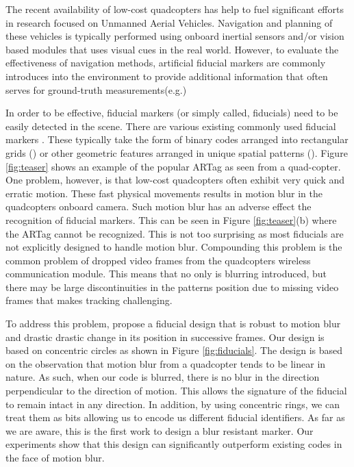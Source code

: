 \documentclass[runningheads]{llncs}
\begin{document}
The recent availability of low-cost quadcopters has help to fuel significant efforts in
research focused on Unmanned Aerial Vehicles.  Navigation and planning of
these vehicles is typically performed using onboard inertial sensors and/or
vision based modules that uses visual cues in the real world\cite{Davison:2007}. 
However, to evaluate the effectiveness of navigation methods, artificial
fiducial markers are commonly introduces into the environment to provide
additional information that often serves for ground-truth
measurements(e.g.\cite{Bosnak:2012,Lim09,Klopschitz:2007})

In order to be effective, fiducial markers (or simply called, fiducials) need
to be easily detected in the scene.  There are various existing commonly
used fiducial markers 
\cite{NaimarkF02,ARToolkit02,Fiala05,Pitag13,runetag11}.
These typically take the form of binary codes arranged into rectangular grids (\cite{ARToolkit02,Fiala05})
or other geometric features arranged in unique spatial patterns
(\cite{NaimarkF02,Pitag13,runetag11}).
Figure \ref{fig:teaser} shows an example of the popular ARTag\cite{Fiala05} as
seen from a quad-copter.  One problem, however, is that low-cost quadcopters
often exhibit very quick and erratic motion.  These fast physical movements
results in motion blur in the quadcopters onboard camera.  Such motion blur has an adverse effect the
recognition of fiducial  markers.  This can be seen in Figure
\ref{fig:teaser}(b) where the ARTag cannot be recognized. This is not too surprising as most
fiducials are not explicitly designed to handle motion blur.  Compounding this
problem is the common problem of dropped video frames from the quadcopters
wireless communication module.   This means that no only is blurring
introduced, but there may be large discontinuities in the patterns position due
to missing video frames that makes tracking challenging.

To address this problem, propose a fiducial design that is robust to motion
blur and drastic drastic change in its position in successive frames.  Our
design is based on concentric circles as shown in Figure \ref{fig:fiducials}. 
The design is based on the observation that motion blur from a quadcopter tends
to be linear in nature.  As such, when our code is blurred, there is no blur in
the direction perpendicular to the direction of motion.   This allows the
signature of the fiducial to remain intact in any direction.  In addition, by
using concentric rings, we can treat them as bits allowing us to encode us
different fiducial identifiers.  As far as we are aware, this is the first work
to design a blur resistant marker.   Our experiments show that this design can
significantly outperform existing codes in the face of motion blur.
\end{document}
